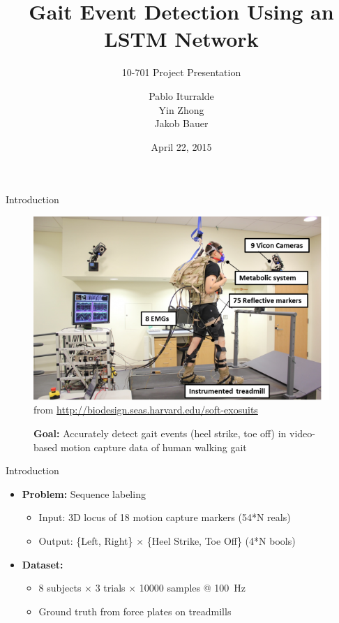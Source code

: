 \documentclass{beamer}
\title
{
    Gait Event Detection Using an LSTM Network
}
\subtitle
{
    10-701
    Project Presentation
}
\author
{
    Pablo Iturralde\\
    Yin Zhong\\
    Jakob Bauer
}
\date
{
    April 22, 2015
}
\begin{document}
\begin{frame}
  \titlepage
\end{frame}

\begin{frame}{Introduction}
    \begin{figure}[H]
        \begin{center}
        \includegraphics[height=.6\textheight]{figures/treadmill.png} \\
        \tiny from \url{http://biodesign.seas.harvard.edu/soft-exosuits}

        \small \textbf{Goal:}  Accurately detect gait events (heel strike, toe off) in video-based motion capture data of human walking gait
        \end{center}
    \end{figure}
\end{frame}

\begin{frame}{Introduction}
    \begin{itemize}
        \item \textbf{Problem:} Sequence labeling
        \begin{itemize}
            \item Input: 3D locus of 18 motion capture markers (54*N reals)
            \item Output: \{Left, Right\} $\times$ \{Heel Strike, Toe Off\} (4*N bools)
        \end{itemize}
        \item \textbf{Dataset:}
        \begin{itemize}
            \item 8 subjects $\times$ 3 trials $\times$ \num{10000} samples @ \SI{100}{\Hz}
            \item Ground truth from force plates on treadmills
        \end{itemize}
    \end{itemize}
\end{frame}
\end{document}
